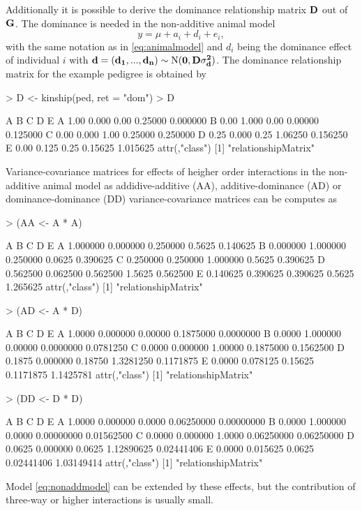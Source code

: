 \documentclass[a4paper,11pt]{article}
\begin{document}
Additionally it is possible to derive the dominance relationship matrix $\bf D$ out of $\bf G$. The dominance is needed in the non-additive animal model
\begin{equation}\label{eq:nonaddmodel}
y = \mu + a_i + d_{i} + e_i,
\end{equation}
with the same notation as in \eqref{eq:animalmodel} and $d_i$ being the dominance effect of individual $i$ with $\bf d  = (d_1,...,d_n) \sim  \text{N}(0,\bf{D} \sigma_d^2)$. The dominance relationship matrix
for the example pedigree is obtained  by
\begin{Schunk}
\begin{Sinput}
> D <- kinship(ped, ret = "dom")
> D
\end{Sinput}
\begin{Soutput}
     A     B    C       D        E
A 1.00 0.000 0.00 0.25000 0.000000
B 0.00 1.000 0.00 0.00000 0.125000
C 0.00 0.000 1.00 0.25000 0.250000
D 0.25 0.000 0.25 1.06250 0.156250
E 0.00 0.125 0.25 0.15625 1.015625
attr(,"class")
[1] "relationshipMatrix"
\end{Soutput}
\end{Schunk}
Variance-covariance matrices for effects of heigher order interactions in the non-additive animal model as addidive-additive (AA), additive-dominance (AD) or dominance-dominance (DD) variance-covariance matrices can be computes as
\begin{Schunk}
\begin{Sinput}
> (AA <- A * A)
\end{Sinput}
\begin{Soutput}
         A        B        C      D        E
A 1.000000 0.000000 0.250000 0.5625 0.140625
B 0.000000 1.000000 0.250000 0.0625 0.390625
C 0.250000 0.250000 1.000000 0.5625 0.390625
D 0.562500 0.062500 0.562500 1.5625 0.562500
E 0.140625 0.390625 0.390625 0.5625 1.265625
attr(,"class")
[1] "relationshipMatrix"
\end{Soutput}
\begin{Sinput}
> (AD <- A * D)
\end{Sinput}
\begin{Soutput}
       A        B       C         D         E
A 1.0000 0.000000 0.00000 0.1875000 0.0000000
B 0.0000 1.000000 0.00000 0.0000000 0.0781250
C 0.0000 0.000000 1.00000 0.1875000 0.1562500
D 0.1875 0.000000 0.18750 1.3281250 0.1171875
E 0.0000 0.078125 0.15625 0.1171875 1.1425781
attr(,"class")
[1] "relationshipMatrix"
\end{Soutput}
\begin{Sinput}
> (DD <- D * D)
\end{Sinput}
\begin{Soutput}
       A        B      C          D          E
A 1.0000 0.000000 0.0000 0.06250000 0.00000000
B 0.0000 1.000000 0.0000 0.00000000 0.01562500
C 0.0000 0.000000 1.0000 0.06250000 0.06250000
D 0.0625 0.000000 0.0625 1.12890625 0.02441406
E 0.0000 0.015625 0.0625 0.02441406 1.03149414
attr(,"class")
[1] "relationshipMatrix"
\end{Soutput}
\end{Schunk}
Model \eqref{eq:nonaddmodel} can be extended by these effects, but the contribution of three-way or higher interactions is usually small.  
\end{document}
